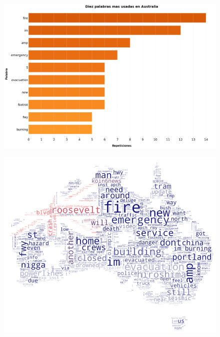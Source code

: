 \documentclass[titlepage,a4paper]{article}
\begin{document}
    \begin{figure}[H]
    \centering
    \includegraphics[width=1\textwidth]{graficos/Analisis de Locacion/10_palabras_mas_usadas_australia.png}
    \caption{}
    \end{figure}
    
    \begin{figure}[H]
    \centering
    \includegraphics[width=1\textwidth]{graficos/Analisis de Locacion/bandera_australia.png}
    \caption{}
    \end{figure}
    
\end{document}
